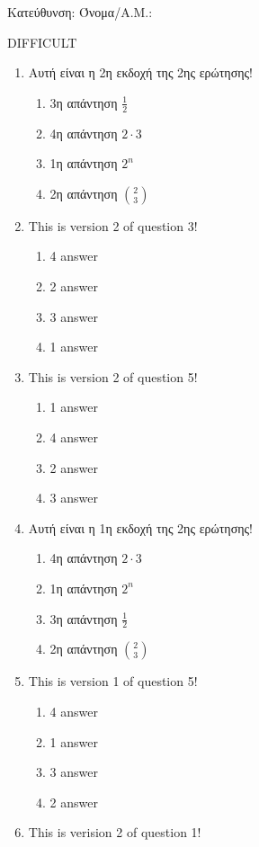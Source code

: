 \documentclass[a4paper, 11pt]{article}
\begin{document}
{\flushleft Κατεύθυνση: }
{\flushleft Όνομα/Α.Μ.: }
\vspace*{0.5cm}
\begin{center} {\Large  DIFFICULT } \end{center}
\begin{enumerate}
\item Αυτή είναι η 2η εκδοχή της 2ης ερώτησης!
\begin{enumerate}[(1)]
    \item 3η απάντηση $\frac{1}{2}$
    \item 4η απάντηση $2\cdot 3$
    \item 1η απάντηση $2^n$
    \item 2η απάντηση $\binom{2}{3}$
\end{enumerate}
\item This is version 2 of question 3!
\begin{enumerate}[(1)]
    \item 4 answer
    \item 2 answer
    \item 3 answer
    \item 1 answer
\end{enumerate}
\item This is version 2 of question 5!
\begin{enumerate}[(1)]
    \item 1 answer
    \item 4 answer
    \item 2 answer
    \item 3 answer
\end{enumerate}
\item Αυτή είναι η 1η εκδοχή της 2ης ερώτησης!
\begin{enumerate}[(1)]
    \item 4η απάντηση $2\cdot 3$
    \item 1η απάντηση $2^n$
    \item 3η απάντηση $\frac{1}{2}$
    \item 2η απάντηση $\binom{2}{3}$
\end{enumerate}
\item This is version 1 of question 5!
\begin{enumerate}[(1)]
    \item 4 answer
    \item 1 answer
    \item 3 answer
    \item 2 answer
\end{enumerate}
\item This is verision 2 of question 1!

\end{enumerate}
\end{document}

